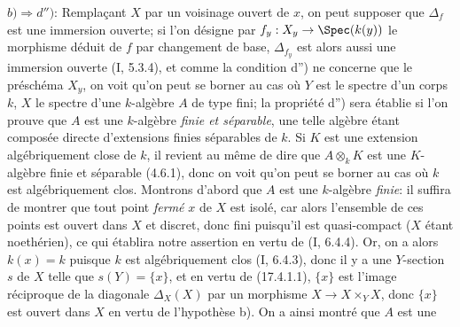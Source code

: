 $b)\Rightarrow d'')$: Remplaçant $X$ par un voisinage ouvert de $x$, on peut supposer que $\Delta_f$ est une immersion ouverte; si l'on désigne par $f_y:X_y\to\Spec(k(y))$ le morphisme déduit de $f$ par changement de base, $\Delta_{f_y}$ est alors aussi une immersion ouverte (I, 5.3.4), et comme la condition d'') ne concerne que le préschéma $X_y$, on voit qu'on peut se borner au cas où $Y$ est le spectre d'un corps $k$, $X$ le spectre d'une $k$-algèbre $A$ de type fini; la propriété d'') sera établie si l'on prouve que $A$ est une $k$-algèbre \emph{finie et séparable}, une telle algèbre étant composée directe d'extensions finies séparables de $k$. Si $K$ est une extension algébriquement close de $k$, il revient au même de dire que $A\otimes_k K$ est une $K$-algèbre finie et séparable (4.6.1), donc on voit qu'on peut se borner au cas où $k$ est algébriquement clos. Montrons d'abord que $A$ est une $k$-algèbre \emph{finie}: il suffira de montrer que tout point \emph{fermé} $x$ de $X$ est isolé, car alors l'ensemble de ces points est ouvert dans $X$ et discret, donc fini puisqu'il est quasi-compact ($X$ étant noethérien), ce qui établira notre assertion en vertu de (I, 6.4.4). Or, on a alors $k(x)=k$ puisque $k$ est algébriquement clos (I, 6.4.3), donc il y a une $Y$-section $s$ de $X$ telle que $s(Y)=\{x\}$, et en vertu de (17.4.1.1), $\{x\}$ est l'image réciproque de la diagonale $\Delta_X(X)$ par un morphisme $X\to X\times_Y X$, donc $\{x\}$ est ouvert dans $X$ en vertu de l'hypothèse b). On a ainsi montré que $A$ est une

